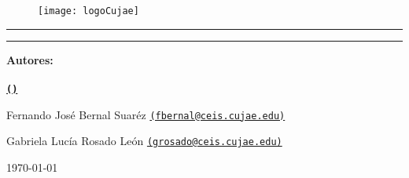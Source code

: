 \begin{titlepage}
	\centering %
	
	\begin{figure}[h]
		\centering
		\texttt{[image: logoCujae]} %
	\end{figure}
	
	{\LARGE \textbf{\university}\par}
	
	\vspace{0.4cm} %
	
	{\Large \faculty \par}
	\vspace{1cm} %
	
	\rule{\textwidth}{1pt} %
	
	\vspace{0.2cm} %
	
	{\Huge\bfseries \getTitle\par}
	
	\vspace{0.2cm} %
	
	\rule{\textwidth}{1pt} %
	
	{\Large \documentName \par}
	\vspace{1.0cm} %
	
	{\Large\bfseries Autores: \\[0.3cm]
		\getAuthor \\[0.2cm]
		\href{mailto:\authorEmail}{\texttt{(\authorEmail)}}\par
		
		Fernando José Bernal Suaréz
		\href{mailto:fbernal@ceis.cujae.edu}{\texttt{(fbernal@ceis.cujae.edu)}}\par
		
		Gabriela Lucía Rosado León	
		\href{mailto:grosado@ceis.cujae.edu}{\texttt{(grosado@ceis.cujae.edu)}}\par
	
	}
	
	\vspace{0.5cm} %
	\vspace{0.5cm} %
	
	{\large \today\par} %
	
	\vfill %
	
	\enlargethispage{0.5cm} %
\end{titlepage}